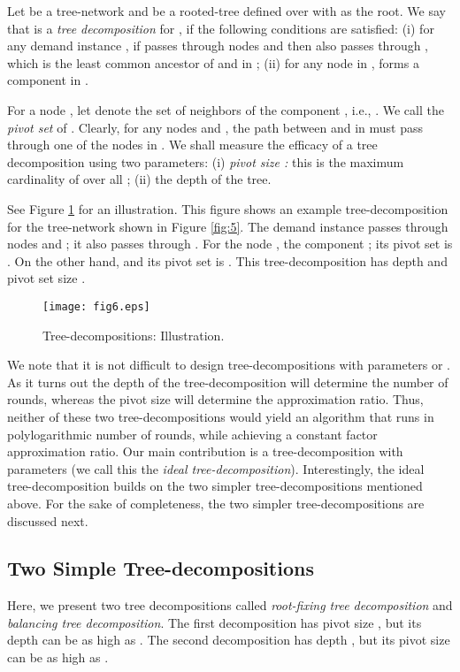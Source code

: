 \documentclass[11pt]{article}
\begin{document}
Let  be a tree-network and  be a rooted-tree defined over  with  as the root.
We say that  is a {\em tree decomposition} for , 
if the following conditions are satisfied: 
(i) for any demand instance , if  passes through nodes  and  then  also passes through
, which is the least common ancestor of  and  in ;
(ii) for any node  in ,  forms a component in .

For a node , let  denote the set of neighbors of the component , i.e., .
We call  the {\em pivot set} of .
Clearly, for any nodes  and , the path between  and  in  must 
pass through one of the nodes in .
We shall measure the efficacy of a tree decomposition  using two parameters:
(i) {\em pivot size : } this is the maximum cardinality of  over all ;
(ii) the depth of the tree. 

See Figure \ref{fig:6} for an illustration.
This figure shows an example tree-decomposition for the tree-network shown in Figure \ref{fig:5}.
The demand instance  passes through nodes  and ; it also
passes through . For the node , the component ; its pivot set is .
On the other hand,  and its pivot set is .
This tree-decomposition has depth  and pivot set size .

\begin{figure}
\centering
\texttt{[image: fig6.eps]}
\caption{
Tree-decompositions: Illustration.
}
\label{fig:6}
\end{figure}

We note that it is not difficult to design tree-decompositions with 
parameters  or .
As it turns out the depth of the tree-decomposition will determine the number of rounds,
whereas the pivot size  will determine the approximation ratio.
Thus, neither of these two tree-decompositions would yield an algorithm
that runs in polylogarithmic number of rounds, while achieving a constant factor approximation ratio.
Our main contribution is a tree-decomposition with parameters 
(we call this the {\em ideal tree-decomposition}).
Interestingly, the ideal tree-decomposition builds on the two simpler tree-decompositions mentioned above.
For the sake of completeness, the two simpler tree-decompositions are discussed next.

\subsection{Two Simple Tree-decompositions}
\label{sec:simple-trees}
Here, we present two tree decompositions called {\em root-fixing tree decomposition}
and {\em balancing tree decomposition}. The first decomposition has pivot size ,
but its depth can be as high as . The second decomposition has depth ,
but its pivot size  can be as high as .
\\
\end{document}
